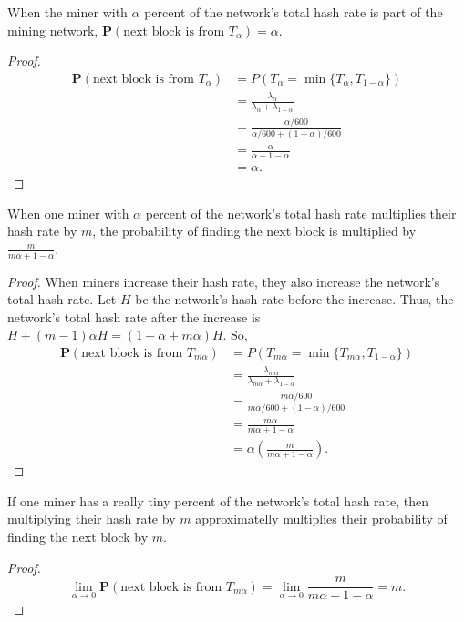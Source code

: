 \begin{theorem}
	When the miner with $\alpha$ percent of the network's total hash rate is part of the mining network, $\mathbf{P}(\text{next block is from $T_\alpha$}) = \alpha.$
\end{theorem}
\begin{proof}
\begin{align*}
	\mathbf{P}(\text{next block is from $T_\alpha$}) &= P \left( T_\alpha = \min\{T_\alpha, T_{1-\alpha}\} \right) \\
		&= \frac{\lambda_\alpha}{\lambda_\alpha + \lambda_{1-\alpha}} \\
		&= \frac{\alpha/600}{\alpha/600 + (1-\alpha)/600} \\
		&= \frac{\alpha}{\alpha + 1 - \alpha} \\
		&= \alpha.
\end{align*}
\end{proof}

\begin{theorem}
	When one miner with $\alpha$ percent of the network's total hash rate multiplies their hash rate by $m$, the probability of finding the next block is multiplied by $\frac{m}{m \alpha + 1 - \alpha}$.
	\label{thm-miner-multiply}
\end{theorem}
\begin{proof}
	When miners increase their hash rate, they also increase the network's total hash rate. Let $H$ be the network's hash rate before the increase. Thus, the network's total hash rate after the increase is $H + (m-1) \alpha H = (1 - \alpha + m \alpha) H$. So,
\begin{align*}
	\mathbf{P}(\text{next block is from $T_{m \alpha}$}) &= P \left( T_{m \alpha} = \min\{T_{m \alpha}, T_{1-\alpha}\} \right) \\
		&= \frac{\lambda_{m \alpha}}{\lambda_{m \alpha} + \lambda_{1-\alpha}} \\
		&= \frac{m \alpha/600}{m \alpha/600 + (1-\alpha)/600} \\
		&= \frac{m \alpha}{m \alpha + 1-\alpha} \\
		&= \alpha \left( \frac{m}{m \alpha + 1 - \alpha} \right).
\end{align*}
\end{proof}

\begin{cor}
	If one miner has a really tiny percent of the network's total hash rate, then multiplying their hash rate by $m$ approximatelly multiplies their probability of finding the next block by $m$.
\end{cor}
\begin{proof}
	$$\lim_{\alpha \rightarrow 0} \mathbf{P}(\text{next block is from $T_{m \alpha}$}) = \lim_{\alpha \rightarrow 0} \frac{m}{m \alpha + 1 - \alpha} = m.$$
\end{proof}

